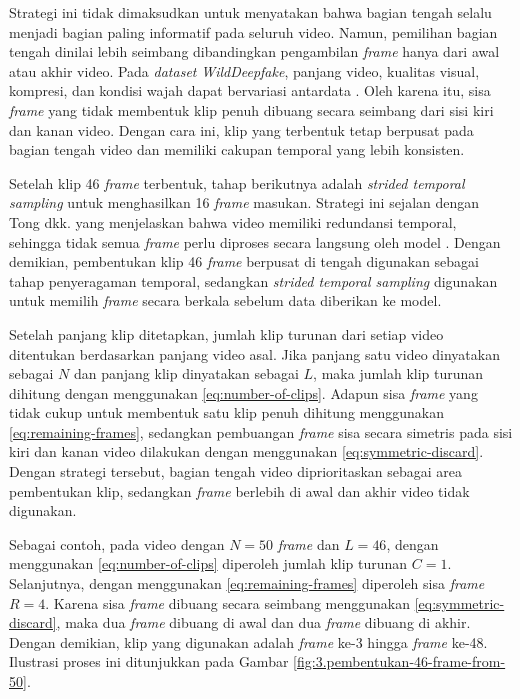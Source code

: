 Strategi ini tidak dimaksudkan untuk menyatakan bahwa bagian tengah selalu menjadi bagian paling informatif pada seluruh video. Namun, pemilihan bagian tengah dinilai lebih seimbang dibandingkan pengambilan \textit{frame} hanya dari awal atau akhir video. Pada \textit{dataset} \textit{WildDeepfake}, panjang video, kualitas visual, kompresi, dan kondisi wajah dapat bervariasi antardata \cite{Zi2024}. Oleh karena itu, sisa \textit{frame} yang tidak membentuk klip penuh dibuang secara seimbang dari sisi kiri dan kanan video. Dengan cara ini, klip yang terbentuk tetap berpusat pada bagian tengah video dan memiliki cakupan temporal yang lebih konsisten. \par

Setelah klip 46 \textit{frame} terbentuk, tahap berikutnya adalah \textit{strided temporal sampling} untuk menghasilkan 16 \textit{frame} masukan. Strategi ini sejalan dengan Tong dkk. yang menjelaskan bahwa video memiliki redundansi temporal, sehingga tidak semua \textit{frame} perlu diproses secara langsung oleh model \cite{tong2022videomaemaskedautoencodersdataefficient}. Dengan demikian, pembentukan klip 46 \textit{frame} berpusat di tengah digunakan sebagai tahap penyeragaman temporal, sedangkan \textit{strided temporal sampling} digunakan untuk memilih \textit{frame} secara berkala sebelum data diberikan ke model. \par

Setelah panjang klip ditetapkan, jumlah klip turunan dari setiap video ditentukan berdasarkan panjang video asal. Jika panjang satu video dinyatakan sebagai $N$ dan panjang klip dinyatakan sebagai $L$, maka jumlah klip turunan dihitung dengan menggunakan \ref{eq:number-of-clips}. Adapun sisa \textit{frame} yang tidak cukup untuk membentuk satu klip penuh dihitung menggunakan \ref{eq:remaining-frames}, sedangkan pembuangan \textit{frame} sisa secara simetris pada sisi kiri dan kanan video dilakukan dengan menggunakan \ref{eq:symmetric-discard}. Dengan strategi tersebut, bagian tengah video diprioritaskan sebagai area pembentukan klip, sedangkan \textit{frame} berlebih di awal dan akhir video tidak digunakan. \par

Sebagai contoh, pada video dengan $N = 50$ \textit{frame} dan $L = 46$, dengan menggunakan \ref{eq:number-of-clips} diperoleh jumlah klip turunan $C = 1$. Selanjutnya, dengan menggunakan \ref{eq:remaining-frames} diperoleh sisa \textit{frame} $R = 4$. Karena sisa \textit{frame} dibuang secara seimbang menggunakan \ref{eq:symmetric-discard}, maka dua \textit{frame} dibuang di awal dan dua \textit{frame} dibuang di akhir. Dengan demikian, klip yang digunakan adalah \textit{frame} ke-3 hingga \textit{frame} ke-48. Ilustrasi proses ini ditunjukkan pada Gambar \ref{fig:3.pembentukan-46-frame-from-50}. \par

